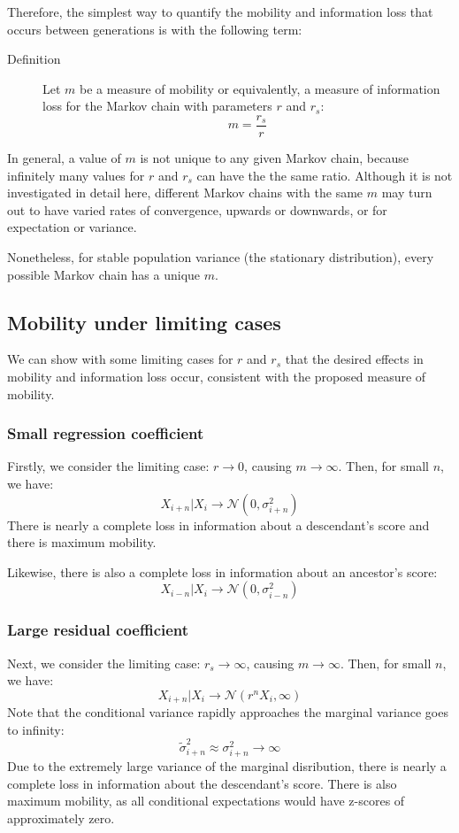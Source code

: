 \documentclass[letterpaper,10pt]{article} %
\begin{document}
Therefore, the simplest way to quantify the mobility and information loss that occurs between generations is with the following term:

\begin{description}
\item [Definition] Let $m$ be a measure of mobility or equivalently, a measure of information loss for the Markov chain with parameters $r$ and $r_s$:
$$m = \frac{r_s}{r}$$
\end{description}

In general, a value of $m$ is not unique to any given Markov chain, because infinitely many values for $r$ and $r_s$ can have the the same ratio. Although it is not investigated in detail here, different Markov chains with the same $m$ may turn out to have varied rates of convergence, upwards or downwards, or for expectation or variance. 

Nonetheless, for stable population variance (the stationary distribution), every possible Markov chain has a unique $m$. 

\subsection{Mobility under limiting cases}

We can show with some limiting cases for $r$ and $r_s$ that the desired effects in mobility and information loss occur, consistent with the proposed measure of mobility. 

\subsubsection*{Small regression coefficient}
Firstly, we consider the limiting case: $r \rightarrow 0$, causing $m \rightarrow \infty$. Then, for small $n$, we have:
$$X_{i+n}|X_i \rightarrow \mathcal{N}(0, \sigma_{i+n}^2)$$
There is nearly a complete loss in information about a descendant's score and there is maximum mobility. 

Likewise, there is also a complete loss in information about an ancestor's score:
$$X_{i-n}|X_i \rightarrow \mathcal{N}(0, \sigma_{i-n}^2)$$


\subsubsection*{Large residual coefficient}
Next, we consider the limiting case: $r_s \rightarrow \infty$, causing $m \rightarrow \infty$. Then, for small $n$, we have:
$$X_{i+n}|X_i \rightarrow \mathcal{N}(r^nX_i, \infty)$$
Note that the conditional variance rapidly approaches the marginal variance goes to infinity:
$$ \tilde{\sigma}_{i+n}^2 \approx \sigma_{i+n}^2 \rightarrow \infty$$
Due to the extremely large variance of the marginal disribution, there is nearly a complete loss in information about the descendant's score. There is also maximum mobility, as all conditional expectations would have z-scores of approximately zero. 
\end{document}
